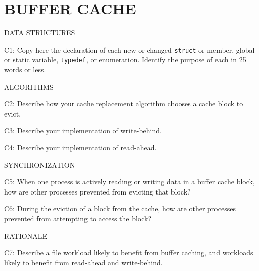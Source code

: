 \section*{BUFFER CACHE}

\begin{aspect}{DATA STRUCTURES}
  \begin{qc}
    C1: Copy here the declaration of each new or changed \lstinline{struct} or member,
    global or static variable, \lstinline{typedef}, or enumeration.
    Identify the purpose of each in 25 words or less.
  \end{qc}
\end{aspect}


\begin{aspect}{ALGORITHMS}
  \begin{qc}
    C2: Describe how your cache replacement algorithm chooses a cache
    block to evict.
  \end{qc}
  \begin{qc}
    C3: Describe your implementation of write-behind.
  \end{qc}
  \begin{qc}
    C4: Describe your implementation of read-ahead.
  \end{qc}
\end{aspect}

\begin{aspect}{SYNCHRONIZATION}
  \begin{qc}
    C5: When one process is actively reading or writing data in a
    buffer cache block, how are other processes prevented from evicting
    that block?
  \end{qc}
  \begin{qc}
    C6: During the eviction of a block from the cache, how are other
    processes prevented from attempting to access the block?
  \end{qc}
\end{aspect}

\begin{aspect}{RATIONALE}
  \begin{qc}
    C7: Describe a file workload likely to benefit from buffer caching,
    and workloads likely to benefit from read-ahead and write-behind.
  \end{qc}
\end{aspect}